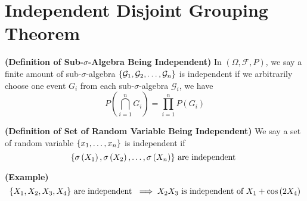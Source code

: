 \documentclass{report}
\begin{document}
\section{Independent Disjoint Grouping Theorem}
\begin{definition}
\textbf{(Definition of Sub-$\sigma$-Algebra Being Independent)} In $\left(\Omega,\mathcal{F},P \right)$, we say a finite amount of sub-$\sigma$-algebra $\{ \mathcal{G}_1,\mathcal{G}_2,\dots ,\mathcal{G}_n \}$ is independent if we arbitrarily choose one event $G_i$ from each sub-$\sigma$-algebra $\mathcal{G}_i$, we have
\begin{equation*}
P\left(\bigcap_{i=1}^n G_i \right)=\prod_{i=1}^n P\left(G_i \right)
\end{equation*}
\end{definition}
\begin{definition}
\textbf{(Definition of Set of Random Variable Being Independent)} We say a set of random variable $\{ x_1,\dots ,x_n \}$ is independent if 
\begin{equation*}
\{ \sigma \left(X_1 \right),\sigma \left(X_2 \right),\dots ,\sigma\left(X_n \right) \}\text{ are independent }
\end{equation*}
\end{definition}
\begin{theorem}
\textbf{(Example)}  
\begin{equation*}
\{ X_1,X_2,X_3,X_4 \}\text{ are independent }\implies X_2X_3\text{ is independent of }X_1+\cos \left(2X_4 \right)
\end{equation*}
\end{theorem}
\end{document}
